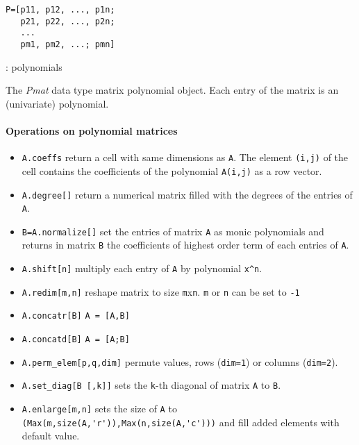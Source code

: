 
\begin{mandesc}
\end{mandesc}
\begin{calling_sequence}
\begin{verbatim}
P=[p11, p12, ..., p1n;
   p21, p22, ..., p2n;
   ...
   pm1, pm2, ...; pmn]
\end{verbatim}
\end{calling_sequence}
\begin{parameters}
  \begin{varlist}
    : polynomials
  \end{varlist}
\end{parameters}

\begin{mandescription}
The \emph{Pmat} data type matrix polynomial object. 
Each entry of the matrix is an (univariate) polynomial.
\end{mandescription}

\paragraph{Operations on polynomial matrices}
\begin{itemize}
\item \verb+A.coeffs+ return a cell with same dimensions as \verb+A+. The element \verb+(i,j)+ of the cell 
  contains the coefficients of the polynomial \verb+A(i,j)+ as a row vector. 
\item \verb+A.degree[]+ return a numerical matrix filled with the degrees of the entries of \verb+A+.
\item \verb+B=A.normalize[]+ set the entries of matrix \verb+A+ as monic polynomials and returns in 
  matrix \verb+B+ the coefficients of highest order term of each entries of \verb+A+.
\item \verb+A.shift[n]+ multiply each entry of \verb+A+ by polynomial \verb+x^n+. 
\end{itemize}

\begin{itemize}
\item \verb+A.redim[m,n]+ reshape matrix to size \verb+m+x\verb+n+. \verb+m+ or \verb+n+ can be set to \verb+-1+ 
\item \verb+A.concatr[B]+ \verb+A = [A,B]+
\item \verb+A.concatd[B]+ \verb+A = [A;B]+
\item \verb+A.perm_elem[p,q,dim]+ permute values, rows (\verb+dim=1+) or columns (\verb+dim=2+).
\item \verb+A.set_diag[B [,k]]+ sets the \verb+k+-th diagonal of matrix \verb+A+ to \verb+B+.
\item \verb+A.enlarge[m,n]+ sets the size of \verb+A+ to \verb+(Max(m,size(A,'r')),Max(n,size(A,'c')))+ and fill 
  added elements with default value.
\end{itemize}

